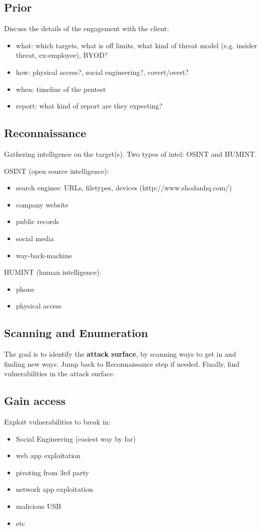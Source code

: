 \documentclass[letterpaper]{article}
\newcommand{\p}{\vspace{1em}\par}		%
\begin{document}
\setcounter{subsection}{-1}	%
\subsection{Prior}
Discuss the details of the engagement with the client:
\begin{itemize}
\item what: which targets, what is off limits, what kind of threat model (e.g. insider threat, ex-employee), BYOD?
\item how: physical access?, social engineering?, covert/overt?
\item when: timeline of the pentest
\item report: what kind of report are they expecting?
\end{itemize} 
	
\subsection{Reconnaissance}
Gathering intelligence on the target(s). Two types of intel: OSINT and HUMINT.
 
\p OSINT (open source intelligence):
\begin{itemize}
\item search engines: URLs, filetypes, devices (http://www.shodanhq.com/)
\item company website
\item public records
\item social media
\item way-back-machine
\end{itemize}

HUMINT (human intelligence):
\begin{itemize}
\item phone
\item physical access
\end{itemize}
	
\subsection{Scanning and Enumeration}
The goal is to identify the \textbf{attack surface}, by scanning ways to get in and finding new ways. Jump back to Reconnaissance step if needed. Finally, find vulnerabilities in the attack surface.
	
\subsection{Gain access}
Exploit vulnerabilities to break in:
\begin{itemize}
\item Social Engineering (easiest way by far)
\item web app exploitation
\item pivoting from 3rd party
\item network app exploitation
\item malicious USB
\item etc
\end{itemize}
	
\end{document}
